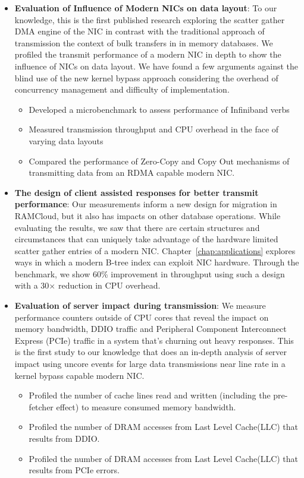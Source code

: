 \begin{itemize}

  \item{\textbf{Evaluation of Influence of Modern NICs on data layout}}: To our knowledge,
   this is the first published research exploring the scatter gather DMA engine of the NIC 
   in contrast with the traditional approach of transmission the context of bulk transfers in in memory databases. 
   We profiled the transmit performance of a modern NIC in depth to show the influence of NICs on data layout. 
   We have found a few arguments against the blind use of the new kernel bypass approach considering
   the overhead of concurrency management and difficulty of implementation.
   \begin{itemize}

    \item Developed a microbenchmark to assess performance of Infiniband verbs

    \item Measured transmission throughput and CPU overhead in the face of varying
    data layouts

    \item Compared the performance of Zero-Copy and Copy Out mechanisms of 
    transmitting data from an RDMA capable modern NIC.
   \end{itemize} 

    \item{\textbf{The design of client assisted responses for better transmit performance}}: Our measurements inform a new design for migration in RAMCloud, but it also has impacts on other database operations.
     While evaluating the results, we saw that there are certain structures and circumstances that can uniquely take advantage of the hardware limited scatter gather entries of a modern NIC.
     Chapter~\ref{chap:applications} explores ways in which a modern B-tree index can exploit NIC hardware.
     Through the benchmark, we show 60\% improvement in throughput using such a design with a 30$\times$ reduction in CPU overhead.


    \item{\textbf{Evaluation of server impact during transmission}}: We measure performance counters outside of CPU cores that reveal the impact on memory bandwidth,
     DDIO traffic and Peripheral Component Interconnect Express (PCIe) traffic in a system that's churning out heavy responses. This is the first study to our knowledge that does an 
     in-depth analysis of server impact using uncore events for large data transmissions near line rate in a kernel bypass capable modern NIC.
     \begin{itemize}
     \item Profiled the number of cache lines read and written (including the pre-fetcher effect) to measure consumed memory bandwidth.
     \item Profiled the number of DRAM accesses from Last Level Cache(LLC) that results from DDIO.
     \item Profiled the number of DRAM accesses from Last Level Cache(LLC) that results from PCIe errors.
     \end{itemize}



\end{itemize}
